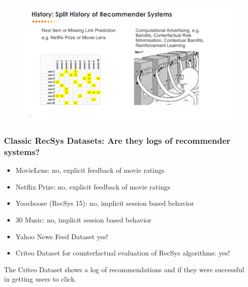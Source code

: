  \begin{frame}
  
   \begin{figure}[h!]
     \includegraphics[scale=0.34]{images/octo.png}
       \centering
       \label{motex1}
   \end{figure}
     
 \end{frame}


 \begin{frame}
  \frametitle{Classic RecSys Datasets: Are they logs of recommender systems?}

  \begin{itemize}
    \item MovieLens: \pause no, explicit feedback of movie ratings \pause
    \item Netflix Prize: \pause no, explicit feedback of movie ratings \pause
    \item Yoochoose (RecSys 15): \pause no, implicit session based behavior \pause
    \item 30 Music: \pause no, implicit session based behavior \pause
    \item Yahoo News Feed Dataset \pause yes!
    \item Criteo Dataset for counterfactual evaluation of RecSys algorithms: \pause yes!
  \end{itemize}

  \pause
  The Criteo Dataset shows a log of recommendations and if they were successful in getting users to click.  
\end{frame}



